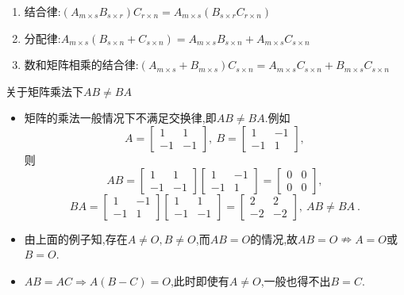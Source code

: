 \documentclass[8pt a4paper,oneside,UTF8]{ctexbook}
\begin{document}
\begin{sloppypar}
\begin{enumerate}
              \begin{enumerate}
                  \item 结合律:$(A_{m\times s}B_{s\times r})C_{r\times n}=A_{m\times s}(B_{s\times r}C_{r\times n})$
                  \item 分配律:$A_{m\times s}(B_{s\times n}+C_{s\times n})=A_{m\times s}B_{s\times n}+A_{m\times s}C_{s\times n}$
                  \item 数和矩阵相乘的结合律:$(A_{m\times s}+B_{m\times s})C_{s\times n}=A_{m\times s}C_{s\times n}+B_{m\times s}C_{s\times n}$
              \end{enumerate}
              \begin{criterion}{关于矩阵乘法下$AB\neq BA$}{}
                  \begin{itemize}
                      \item 矩阵的乘法一般情况下不满足交换律,即$AB\neq BA.$例如
                            $$A=\begin{bmatrix}1&1\\-1&-1\end{bmatrix},\:B=\begin{bmatrix}1&-1\\-1&1\end{bmatrix},$$则$$AB=\begin{bmatrix}1&1\\-1&-1\end{bmatrix}\begin{bmatrix}1&-1\\-1&1\end{bmatrix}=\begin{bmatrix}0&0\\0&0\end{bmatrix},$$$$BA=\begin{bmatrix}1&-1\\-1&1\end{bmatrix}\begin{bmatrix}1&1\\-1&-1\end{bmatrix}=\begin{bmatrix}2&2\\-2&-2\end{bmatrix},\:AB\neq BA\:.$$
                      \item 由上面的例子知,存在$A\neq O,B\neq O$,而$AB=O$的情况,故$AB=O\nRightarrow A=O$或$B=O$.
                      \item $AB=AC\Rightarrow A(B-C)=O$,此时即使有$A\neq O$,一般也得不出$B=C$.
                  \end{itemize}

\end{criterion}
\end{enumerate}
\end{sloppypar}
\end{document}
